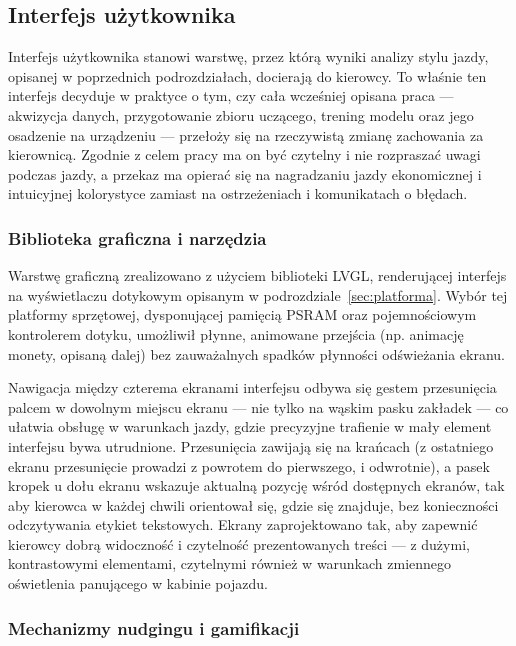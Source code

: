 \subsection{Interfejs użytkownika}
\label{sec:ui}

Interfejs użytkownika stanowi warstwę, przez którą wyniki analizy stylu
jazdy, opisanej w poprzednich podrozdziałach, docierają do kierowcy. To
właśnie ten interfejs decyduje w praktyce o tym, czy cała wcześniej opisana
praca --- akwizycja danych, przygotowanie zbioru uczącego, trening modelu
oraz jego osadzenie na urządzeniu --- przełoży się na rzeczywistą zmianę
zachowania za kierownicą. Zgodnie z celem pracy ma on być czytelny i nie
rozpraszać uwagi podczas jazdy, a przekaz ma opierać się na nagradzaniu
jazdy ekonomicznej i intuicyjnej kolorystyce zamiast na ostrzeżeniach
i komunikatach o błędach.

\subsubsection{Biblioteka graficzna i narzędzia}

Warstwę graficzną zrealizowano z użyciem biblioteki LVGL, renderującej
interfejs na wyświetlaczu dotykowym opisanym w podrozdziale~\ref{sec:platforma}.
Wybór tej platformy sprzętowej, dysponującej pamięcią PSRAM oraz
pojemnościowym kontrolerem dotyku, umożliwił płynne, animowane przejścia
(np. animację monety, opisaną dalej) bez zauważalnych spadków płynności
odświeżania ekranu.

Nawigacja między czterema ekranami interfejsu odbywa się gestem przesunięcia
palcem w dowolnym miejscu ekranu --- nie tylko na wąskim pasku zakładek ---
co ułatwia obsługę w warunkach jazdy, gdzie precyzyjne trafienie w mały
element interfejsu bywa utrudnione. Przesunięcia zawijają się na krańcach
(z ostatniego ekranu przesunięcie prowadzi z powrotem do pierwszego, i
odwrotnie), a pasek kropek u dołu ekranu wskazuje aktualną pozycję wśród
dostępnych ekranów, tak aby kierowca w każdej chwili orientował się, gdzie
się znajduje, bez konieczności odczytywania etykiet tekstowych. Ekrany
zaprojektowano tak, aby zapewnić kierowcy dobrą widoczność i czytelność
prezentowanych treści --- z dużymi, kontrastowymi elementami, czytelnymi
również w warunkach zmiennego oświetlenia panującego w kabinie pojazdu.

\subsubsection{Mechanizmy nudgingu i gamifikacji}

